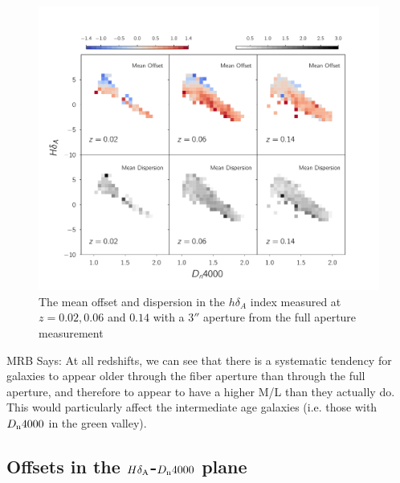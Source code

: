 \begin{figure}
\includegraphics[width=\textwidth]{figures/hdelta_full_aperture_comparisons.pdf}
\caption[The mean offset and dispersion in the $h\delta_{A}$ index measured at $z = 0.02,0.06$ and $0.14$ with a $3''$ aperture from the full aperture measurement ]{ The mean offset and dispersion in the $h\delta_{A}$ index measured at $z = 0.02,0.06$ and $0.14$ with a $3''$ aperture from the full aperture measurement 
\label{fig:offset_hdelta}}
\end{figure}

MRB Says: At all redshifts, we can see that there is a systematic tendency for galaxies to appear older through the fiber aperture than through the full aperture, and therefore to appear to have a higher M/L than they actually do. This would particularly affect the intermediate age galaxies (i.e. those with $D_{\rm n}4000$ in the green valley).\\


\subsection{Offsets in the $H\delta_{\rm A}$-$D_{\rm n}4000$ plane}

